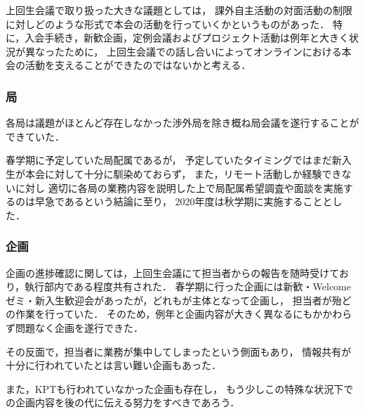 上回生会議で取り扱った大きな議題としては，
課外自主活動の対面活動の制限に対しどのような形式で本会の活動を行っていくかというものがあった．
特に，入会手続き，新歓企画，定例会議およびプロジェクト活動は例年と大きく状況が異なったために，
上回生会議での話し合いによってオンラインにおける本会の活動を支えることができたのではないかと考える．

\subsubsection*{局}
各局は議題がほとんど存在しなかった渉外局を除き概ね局会議を遂行することができていた．

春学期に予定していた局配属であるが，
予定していたタイミングではまだ新入生が本会に対して十分に馴染めておらず，
また，リモート活動しか経験できない\firstGrade{}に対し
適切に各局の業務内容を説明した上で局配属希望調査や面談を実施するのは早急であるという結論に至り，
2020年度は秋学期に実施することとした．


\subsubsection*{企画}
企画の進捗確認に関しては，上回生会議にて担当者からの報告を随時受けており，執行部内である程度共有された．
春学期に行った企画には新歓・Welcomeゼミ・新入生歓迎会があったが，どれも\secondGrade{}が主体となって企画し，
担当者が殆どの作業を行っていた．
そのため，例年と企画内容が大きく異なるにもかかわらず問題なく企画を遂行できた．

その反面で，担当者に業務が集中してしまったという側面もあり，
情報共有が十分に行われていたとは言い難い企画もあった．

また，KPTも行われていなかった企画も存在し，
もう少しこの特殊な状況下での企画内容を後の代に伝える努力をすべきであろう．


